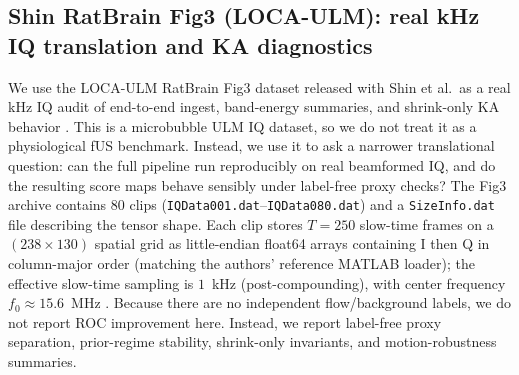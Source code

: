 \subsection{Shin RatBrain Fig3 (LOCA-ULM): real kHz IQ translation and KA diagnostics}
\label{sec:shin-ratbrain}

We use the LOCA-ULM RatBrain Fig3 dataset released with Shin et al.\ as a real kHz IQ audit of end-to-end ingest, band-energy summaries, and shrink-only KA behavior \cite{ShinLOCAULM2024,ShinZenodo10711806}. This is a microbubble ULM IQ dataset, so we do not treat it as a physiological fUS benchmark. Instead, we use it to ask a narrower translational question: can the full pipeline run reproducibly on real beamformed IQ, and do the resulting score maps behave sensibly under label-free proxy checks? The Fig3 archive contains 80 clips (\texttt{IQData001.dat}--\texttt{IQData080.dat}) and a \texttt{SizeInfo.dat} file describing the tensor shape. Each clip stores $T=250$ slow-time frames on a $(238\times 130)$ spatial grid as little-endian float64 arrays containing I then Q in column-major order (matching the authors' reference MATLAB loader); the effective slow-time sampling is $1$~kHz (post-compounding), with center frequency $f_0\approx 15.6$~MHz \cite{ShinLOCAULM2024}. Because there are no independent flow/background labels, we do not report ROC improvement here. Instead, we report label-free proxy separation, prior-regime stability, shrink-only invariants, and motion-robustness summaries.

